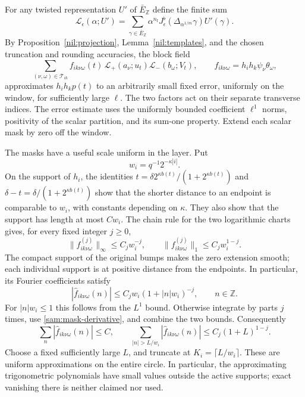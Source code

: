 For any twisted representation \(U'\) of \(\bar E_{\mathbb Z}\)
define the finite sum
\[
 \mathcal L_\epsilon(\alpha;U')=
 \sum_{\gamma\in\bar E_{\mathbb Z}}
 \alpha^{n_{\mathrm f}}
 J_\epsilon^\flat(\Delta_{\alpha^{1/m}}\gamma)U'(\gamma).
\]
By Proposition~\ref{nil:projection}, Lemma~\ref{nil:templates}, and the
chosen truncation and rounding accuracies, the block field
\begin{equation}\label{sam:template-field}
 \sum_{(\nu,\omega)\in\mathcal T_{ik}}
 f_{ik\nu\omega}(t)\,
 \mathcal L_+(a_\nu;u_t)
 \mathcal L_-(b_\omega;V_t),
 \qquad
 f_{ik\nu\omega}=h_i h_k\psi_\nu\theta_\omega,
\end{equation}
approximates \(h_i h_kp(t)\) to an arbitrarily small fixed error,
uniformly on the window, for sufficiently large \(\ell\).  The two
factors act on their separate transverse indices.  The error estimate
uses the uniformly bounded coefficient \(\ell^1\) norms, positivity
of the scalar partition, and its sum-one property.  Extend each
scalar mask by zero off the window.

The masks have a useful scale uniform in the layer.  Put
\[
 w_i=q^{-1}2^{-\kappa|i|}.
\]
On the support of \(h_i\), the identities
\(t=\delta 2^{\kappa b(t)}/(1+2^{\kappa b(t)})\) and
\(\delta-t=\delta/(1+2^{\kappa b(t)})\) show that the shorter
distance to an endpoint is comparable to \(w_i\), with constants
depending on \(\kappa\).  They also show that the support has
length at most \(Cw_i\).  The chain rule for the two logarithmic
charts gives, for every fixed integer \(j\ge0\),
\begin{equation}\label{sam:mask-derivative}
 \|f_{ik\nu\omega}^{(j)}\|_\infty\le C_jw_i^{-j},
 \qquad
 \|f_{ik\nu\omega}^{(j)}\|_1\le C_jw_i^{1-j}.
\end{equation}
The compact support of the original bumps makes the zero extension
smooth; each individual support is at positive distance from the
endpoints.  In particular, its Fourier coefficients satisfy
\begin{equation}\label{sam:fourier}
 |\widehat f_{ik\nu\omega}(n)|
 \le C_jw_i(1+|n|w_i)^{-j},\qquad n\in\mathbb Z.
\end{equation}
For \(|n|w_i\le1\) this follows from the \(L^1\) bound.  Otherwise
integrate by parts \(j\) times, use
\eqref{sam:mask-derivative}, and combine the two bounds.
Consequently
\[
 \sum_n|\widehat f_{ik\nu\omega}(n)|\le C,
 \qquad
 \sum_{|n|>L/w_i}|\widehat f_{ik\nu\omega}(n)|
 \le C_j(1+L)^{1-j}.
\]
Choose a fixed sufficiently large \(L\), and truncate at
\(K_i=\lceil L/w_i\rceil\).  These are uniform approximations on
the entire circle.  In particular, the approximating trigonometric
polynomials have small values outside the active supports; exact
vanishing there is neither claimed nor used.

